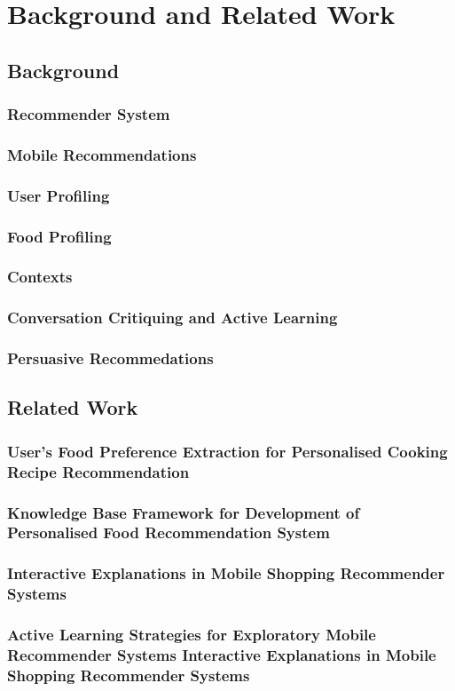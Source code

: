 
\chapter{Background and Related Work}
\section{Background}
\subsection{Recommender System}

\subsection{Mobile Recommendations}

\subsection{User Profiling}

\subsection{Food Profiling}

\subsection{Contexts}

\subsection{Conversation Critiquing and Active Learning}

\subsection{Persuasive Recommedations}

\section{Related Work}

\subsection{User's Food Preference Extraction for Personalised Cooking Recipe Recommendation}

\subsection{Knowledge Base Framework for Development of Personalised Food Recommendation System}

\subsection{Interactive Explanations in Mobile Shopping Recommender Systems}

\subsection{Active Learning Strategies for Exploratory Mobile Recommender Systems Interactive Explanations in Mobile Shopping Recommender Systems}